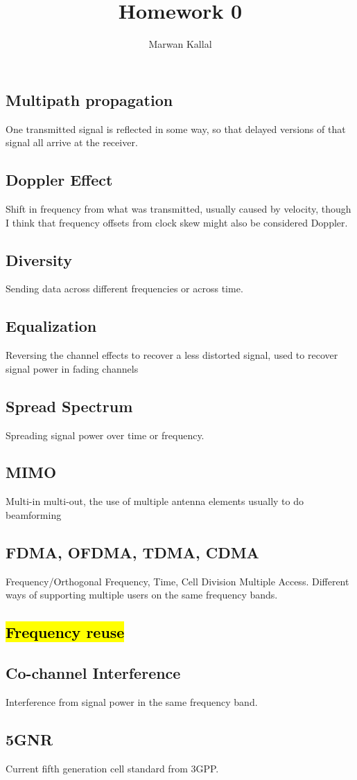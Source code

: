\documentclass[]{article}
\title{Homework 0}
\author{Marwan Kallal}
\begin{document}
\maketitle


\section{}
\subsection{Multipath propagation}
One transmitted signal is reflected in some way, so that delayed versions of that signal all arrive at the receiver.
\subsection{Doppler Effect}
Shift in frequency from what was transmitted, usually caused by velocity, though I think that frequency offsets from clock skew might also be considered Doppler.
\subsection{Diversity}
Sending data across different frequencies or across time.
\subsection{Equalization}
Reversing the channel effects to recover a less distorted signal, used to recover signal power in fading channels
\subsection{Spread Spectrum}
Spreading signal power over time or frequency.
\subsection{MIMO}
Multi-in multi-out, the use of multiple antenna elements usually to do beamforming
\subsection{FDMA, OFDMA, TDMA, CDMA}
Frequency/Orthogonal Frequency, Time, Cell Division Multiple Access. Different ways of supporting multiple users on the same frequency bands.
\subsection{\hl{Frequency reuse}}

\subsection{Co-channel Interference}
Interference from signal power in the same frequency band. 
\subsection{5GNR}
Current fifth generation cell standard from 3GPP.
\end{document}
